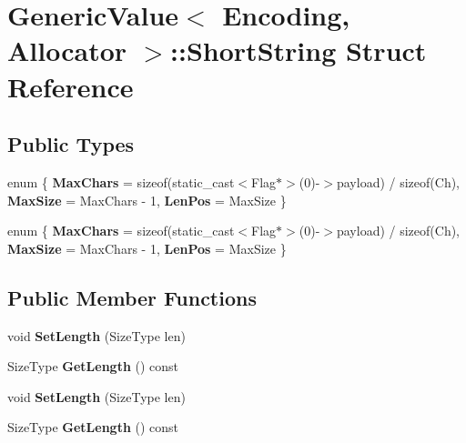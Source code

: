 \hypertarget{struct_generic_value_1_1_short_string}{}\section{Generic\+Value$<$ Encoding, Allocator $>$\+:\+:Short\+String Struct Reference}
\label{struct_generic_value_1_1_short_string}
\subsection*{Public Types}
\begin{DoxyCompactItemize}
\item 
enum \{ {\bfseries Max\+Chars} = sizeof(static\+\_\+cast$<$Flag$\ast$$>$(0)-\/$>$payload) / sizeof(Ch), 
{\bfseries Max\+Size} = Max\+Chars -\/ 1, 
{\bfseries Len\+Pos} = Max\+Size
 \}\hypertarget{struct_generic_value_1_1_short_string_a9458c3a0d0eda7bac977cb41f1a19360}{}\label{struct_generic_value_1_1_short_string_a9458c3a0d0eda7bac977cb41f1a19360}

\item 
enum \{ {\bfseries Max\+Chars} = sizeof(static\+\_\+cast$<$Flag$\ast$$>$(0)-\/$>$payload) / sizeof(Ch), 
{\bfseries Max\+Size} = Max\+Chars -\/ 1, 
{\bfseries Len\+Pos} = Max\+Size
 \}\hypertarget{struct_generic_value_1_1_short_string_a0d027e98d6a883976909734fb363de4c}{}\label{struct_generic_value_1_1_short_string_a0d027e98d6a883976909734fb363de4c}

\end{DoxyCompactItemize}
\subsection*{Public Member Functions}
\begin{DoxyCompactItemize}
\item 
void {\bfseries Set\+Length} (Size\+Type len)\hypertarget{struct_generic_value_1_1_short_string_adbfe8461e0cb0ccb2cb3825489e743c2}{}\label{struct_generic_value_1_1_short_string_adbfe8461e0cb0ccb2cb3825489e743c2}

\item 
Size\+Type {\bfseries Get\+Length} () const \hypertarget{struct_generic_value_1_1_short_string_a65bea5171312b2243a1ec70ec6fa93cd}{}\label{struct_generic_value_1_1_short_string_a65bea5171312b2243a1ec70ec6fa93cd}

\item 
void {\bfseries Set\+Length} (Size\+Type len)\hypertarget{struct_generic_value_1_1_short_string_adbfe8461e0cb0ccb2cb3825489e743c2}{}\label{struct_generic_value_1_1_short_string_adbfe8461e0cb0ccb2cb3825489e743c2}

\item 
Size\+Type {\bfseries Get\+Length} () const \hypertarget{struct_generic_value_1_1_short_string_a65bea5171312b2243a1ec70ec6fa93cd}{}\label{struct_generic_value_1_1_short_string_a65bea5171312b2243a1ec70ec6fa93cd}

\end{DoxyCompactItemize}
